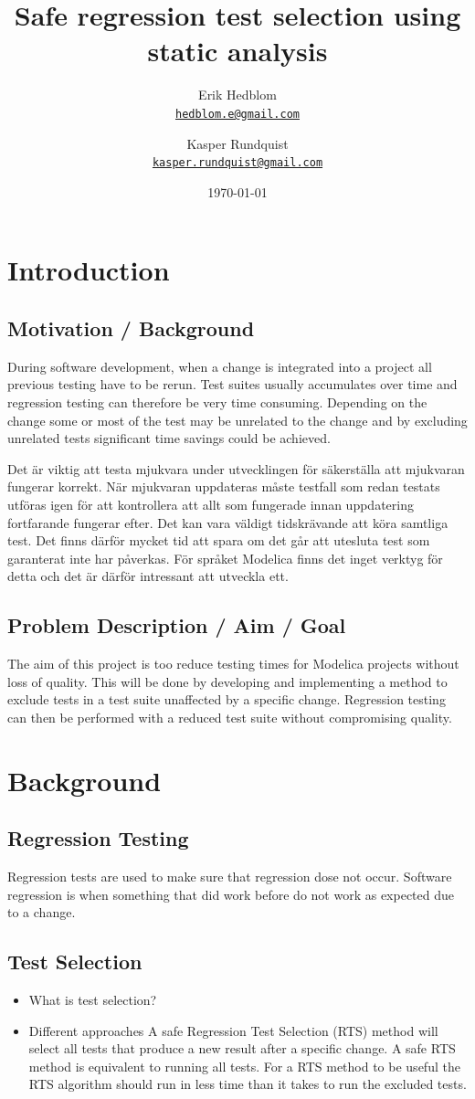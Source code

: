 \documentclass{cslthse-msc}
\author{
	Erik Hedblom \\
	{\normalsize \href{mailto:hedblom.e@gmail.com}{\texttt{hedblom.e@gmail.com}}}
	\and
	Kasper Rundquist \\
	{\normalsize \href{mailto:kasper.rundquist@gmail.com}{\texttt{kasper.rundquist@gmail.com}}}
}
\title{Safe regression test selection using static analysis}
\date{\today}
\begin{document}
\makefrontmatter
\chapter[Introduction]{Introduction}

\section{Motivation / Background}
During software development, when a change is integrated into a project all previous testing have to be rerun. Test suites usually accumulates over time and regression testing can therefore be very time consuming. Depending on the change some or most of the test may be unrelated to the change and by excluding unrelated tests significant time savings could be achieved. ~\cite{DUMMY}


Det är viktig att testa mjukvara under utvecklingen för säkerställa att mjukvaran fungerar korrekt. När mjukvaran uppdateras måste testfall som redan testats utföras igen för att kontrollera att allt som fungerade innan uppdatering fortfarande fungerar efter. Det kan vara väldigt tidskrävande att köra samtliga test. Det finns därför mycket tid att spara om det går att utesluta test som garanterat inte har påverkas. För språket Modelica finns det inget verktyg för detta och det är därför intressant att utveckla ett.

\section{Problem Description / Aim / Goal}

The aim of this project is too reduce testing times for Modelica projects without loss of quality. This will be done by developing and implementing a method to exclude tests in a test suite unaffected by a specific change. Regression testing can then be performed with a reduced test suite without compromising quality. 

\chapter[Background]{Background}
\section{Regression Testing}
Regression tests are used to make sure that regression dose not occur. Software regression is when something that did work before do not work as expected due to a change.
\section{Test Selection}
\begin{itemize}
	\item What is test selection?
	\item Different approaches
A safe Regression Test Selection (RTS) method will select all tests that produce a new result after a specific change. A safe RTS method is equivalent to running all tests. For a RTS method to be useful the RTS algorithm should run in less time than it takes to run the excluded tests.
\end{itemize}
\end{document}
